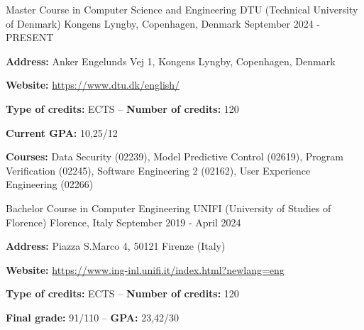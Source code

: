 

\begin{cventries}

  \cventry
    {Master Course in Computer Science and Engineering} %
    {DTU (Technical University of Denmark)} %
    {Kongens Lyngby, Copenhagen, Denmark} %
    {September 2024 - PRESENT} %
    {
      \begin{cvitems} %
        \item {\textbf{Address:} Anker Engelunds Vej 1, Kongens Lyngby, Copenhagen, Denmark}
        \item {\textbf{Website:} \href{https://www.dtu.dk/english/}{https://www.dtu.dk/english/}}
        \item {\textbf{Type of credits:} ECTS – \textbf{Number of credits:} 120}
        \item {\textbf{Current GPA:} 10,25/12}
        \item {\textbf{Courses:} Data Security (02239), Model Predictive Control (02619), Program Verification (02245), Software Engineering 2 (02162), User Experience Engineering (02266)}
      \end{cvitems}
    }

  \cventry
    {Bachelor Course in Computer Engineering} %
    {UNIFI (University of Studies of Florence)} %
    {Florence, Italy} %
    {September 2019 - April 2024} %
    {
      \begin{cvitems} %
        \item {\textbf{Address:} Piazza S.Marco 4, 50121 Firenze (Italy)}
        \item {\textbf{Website:} \href{https://www.ing-inl.unifi.it/index.html?newlang=eng}{https://www.ing-inl.unifi.it/index.html?newlang=eng}}
        \item {\textbf{Type of credits:} ECTS – \textbf{Number of credits:} 120}
        \item {\textbf{Final grade:} 91/110 – \textbf{GPA:} 23,42/30}
      \end{cvitems}
    }


\end{cventries}
